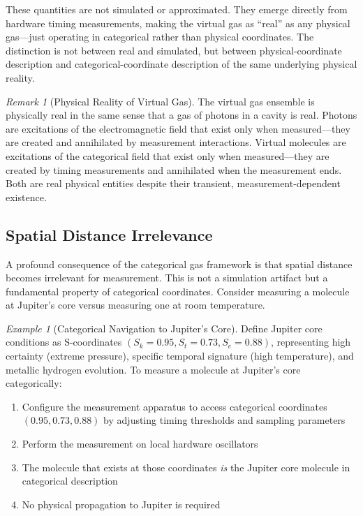 \documentclass[12pt,a4paper]{article}
\theoremstyle{definition}
\theoremstyle{remark}
\newtheorem{remark}[theorem]{Remark}
\newtheorem{example}[theorem]{Example}
\begin{document}
These quantities are not simulated or approximated. They emerge directly from hardware timing measurements, making the virtual gas as ``real'' as any physical gas—just operating in categorical rather than physical coordinates. The distinction is not between real and simulated, but between physical-coordinate description and categorical-coordinate description of the same underlying physical reality.

\begin{remark}[Physical Reality of Virtual Gas]
\label{rem:physical_reality}
The virtual gas ensemble is physically real in the same sense that a gas of photons in a cavity is real. Photons are excitations of the electromagnetic field that exist only when measured—they are created and annihilated by measurement interactions. Virtual molecules are excitations of the categorical field that exist only when measured—they are created by timing measurements and annihilated when the measurement ends. Both are real physical entities despite their transient, measurement-dependent existence.
\end{remark}

\subsection{Spatial Distance Irrelevance}

A profound consequence of the categorical gas framework is that spatial distance becomes irrelevant for measurement. This is not a simulation artifact but a fundamental property of categorical coordinates. Consider measuring a molecule at Jupiter's core versus measuring one at room temperature.

\begin{example}[Categorical Navigation to Jupiter's Core]
\label{ex:jupiter_core}
Define Jupiter core conditions as S-coordinates $(S_k = 0.95, S_t = 0.73, S_e = 0.88)$, representing high certainty (extreme pressure), specific temporal signature (high temperature), and metallic hydrogen evolution. To measure a molecule at Jupiter's core categorically:
\begin{enumerate}
    \item Configure the measurement apparatus to access categorical coordinates $(0.95, 0.73, 0.88)$ by adjusting timing thresholds and sampling parameters
    \item Perform the measurement on local hardware oscillators
    \item The molecule that exists at those coordinates \textit{is} the Jupiter core molecule in categorical description
    \item No physical propagation to Jupiter is required
\end{enumerate}
\end{example}
\end{document}
